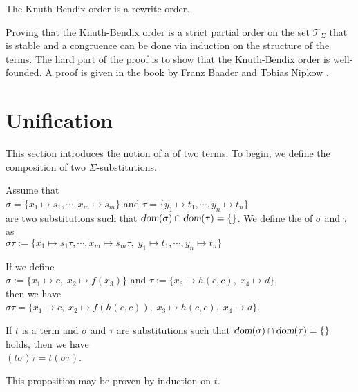 \begin{Theorem}
  The Knuth-Bendix order is a rewrite order.
\end{Theorem}

Proving that the Knuth-Bendix order is a strict partial order on the set $\mathcal{T}_\Sigma$ that is stable
and a congruence can be done via induction on the structure of the terms.  The hard part of the proof is to
show that the Knuth-Bendix order is well-founded.  A proof is given in the book by Franz Baader and Tobias
Nipkow \cite{baader:1998}.

\section{Unification}
This section introduces the notion of a  of two terms.
To begin, we define the composition of two $\Sigma$-substitutions.

\begin{Definition} 
    Assume that \\[0.2cm]
    \hspace*{1.3cm}
    $\sigma = \{ x_1 \mapsto s_1, \cdots, x_m \mapsto s_m \}$
    \quad and \quad
    $\tau = \{ y_1 \mapsto t_1, \cdots, y_n \mapsto t_n \}$
    \\[0.2cm]
    are two substitutions such that $\textsl{dom}(\sigma) \cap \textsl{dom}(\tau) = \{\}$.
    We define the    of $\sigma$ and $\tau$  as
    \\[0.2cm]
    \hspace*{1.3cm}
    $\sigma\tau := \{ x_1 \mapsto s_1\tau, \cdots, x_m \mapsto s_m\tau,\; y_1 \mapsto t_1, \cdots, y_n \mapsto t_n \}$
    \eox
\end{Definition}

\example
If we define
\\[0.2cm]
\hspace*{1.3cm}
$\sigma := \{ x_1 \mapsto c,\; x_2 \mapsto f(x_3) \}$ \quad and \quad
$\tau := \{ x_3 \mapsto h(c,c),\; x_4 \mapsto d \}$,
\\[0.2cm]
then we have
\\[0.2cm]
\hspace*{1.3cm}
$\sigma\tau = \{ x_1 \mapsto c,\; x_2 \mapsto f(h(c,c)),\; x_3 \mapsto h(c,c),\;x_4 \mapsto d \}$.
\eoxs
\vspace{0.3cm}

\begin{Proposition} \label{satz:composition}
    If $t$ is a term and $\sigma$ and $\tau$ are substitutions such that  
    $\textsl{dom}(\sigma) \cap \textsl{dom}(\tau) = \{\}$ holds, then we have
    \\[0.2cm]
    \hspace*{1.3cm} $(t \sigma)\tau = t (\sigma\tau)$.
    \eoxs
\end{Proposition}
This proposition may be proven by induction on $t$.

